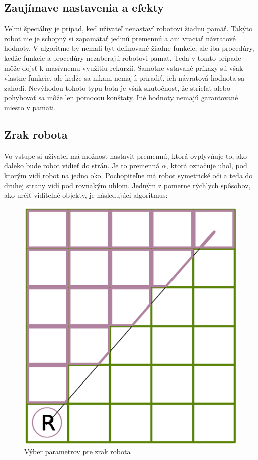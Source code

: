\subsection{Zaujímave nastavenia a efekty}

Velmi špeciálny je prípad, keď užívateľ nenastaví robotovi žiadnu pamäť. Takýto robot nie je schopný si zapamätať jedinú premennú a ani vraciať návratové hodnoty. V algoritme by nemali byť definované žiadne funkcie, ale iba procedúry, kedže funkcie a procedúry nezaberajú robotovi pamať. Teda v tomto prípade môže dojsť k masívnemu využitiu rekurzií. Samotne vstavané príkazy sú však vlastne funkcie, ale kedže sa nikam nemajú priradiť, ich návratová hodnota sa zahodí. Nevýhodou tohoto typu bota je však skutočnost, že strieľať alebo pohybovať sa môže len pomocou konštaty. Iné hodnoty nemajú garantované miesto v pamäti.

\subsection{Zrak robota}
Vo vstupe si užívateľ má možnosť nastavit premennú, ktorá ovplyvňuje to, ako ďaleko bude robot vidieť do strán. Je to premenná $\alpha$, ktorá označuje uhol, pod ktorým vidí robot na jedno oko. Pochopiteľne má robot symetrické oči a teda do druhej strany vidí pod rovnakým uhlom. Jedným z pomerne rýchlych spôsobov, ako určiť viditeľné objekty, je následujúci algoritmus:

\begin{figure}
\centering
\includegraphics[totalheight=0.2\textheight,width=.6\textwidth]{chooseVisible}
\caption {Výber parametrov pre zrak robota}
\label{choosing}
\end{figure}

